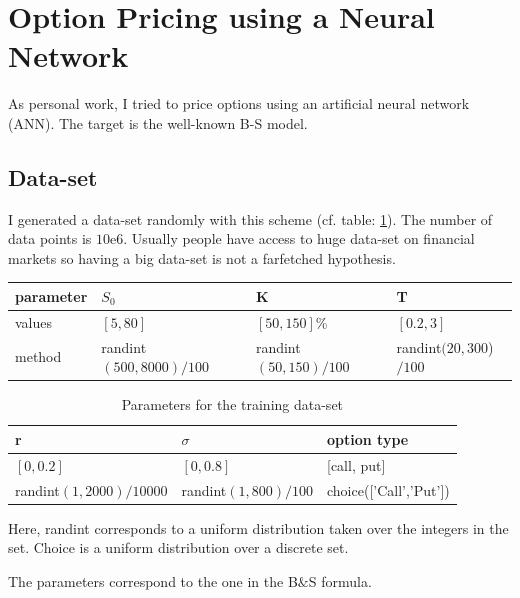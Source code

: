 \section{Option Pricing using a Neural Network}
As personal work, I tried to price options using an artificial neural network (ANN). The target is the well-known B-S model.


\subsection{Data-set}

I generated a data-set randomly with this scheme (cf. table: \ref{table:data_ANN}). The number of data points is $10$e$6$. Usually people have access to huge data-set on financial markets so having a big data-set is not a farfetched hypothesis.


\begin{table}
\begin{tabular}{  | m{2.5cm} | m{4 cm} | m{4 cm}| m{4 cm}   } 
\hline
parameter & $S_0$ &  K & T   \\ 
\hline
\hline
values &$[5,80]$ & $[50,150]$\% & $[0.2,3]$  \\
\hline
method & randint$(500,8000)/100$ & randint$(50,150)/100$ & randint$(20,300$) $/ 100 $ \\
\hline
\end{tabular}
\end{table}



\begin{table}
\begin{tabular}{  m{4.5 cm} |m{4.5 cm} |m{4.5 cm} |  } 
\hline
 r & $\sigma $ & option type \\ 
\hline
\hline
 $[0,0.2]$ & $[0,0.8]$ & [call, put] \\
\hline
 randint$(1,2000) / 10000$ & randint$(1, 800)/100$  & choice(['Call','Put']) \\
\hline
\end{tabular}

\caption{Parameters for the training data-set}
\label{table:data_ANN}
\end{table}




Here, randint corresponds to a uniform distribution taken over the integers in the set. Choice is a uniform distribution over a discrete set.




The parameters correspond to the one in the B$\&$S formula.

